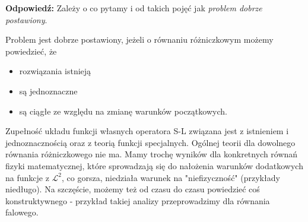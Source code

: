 \documentclass[../main.tex]{subfiles}
\begin{document}
\textbf{Odpowiedź:} Zależy o co pytamy i od takich pojęć jak \textit{problem dobrze postawiony}.
\begin{definicja}
		Problem jest dobrze postawiony, jeżeli o równaniu różniczkowym możemy powiedzieć, że
		\begin{itemize}
				\item rozwiązania istnieją
				\item są jednoznaczne
				\item są ciągłe ze względu na zmianę warunków początkowych.
		\end{itemize}
\end{definicja}
Zupełność układu funkcji własnych operatora S-L związana jest z istnieniem i jednoznacznością oraz z teorią funkcji specjalnych. Ogólnej teorii dla dowolnego równania różniczkowego nie ma. Mamy trochę wyników dla konkretnych równań fizyki matematycznej, które sprowadzają się do nałożenia warunków dodatkowych na funkcje z $\mathcal{L}^2$, co gorsza, niedziała warunek na "niefizyczność" (przykłady niedługo). Na szczęście, możemy też od czasu do czasu powiedzieć coś konstruktywnego - przykład takiej analizy przeprowadzimy dla równania falowego.
\end{document}
